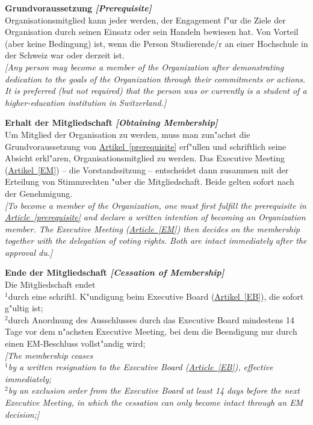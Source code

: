 \documentclass[10pt]{article}
\newcounter{qcounter}
\begin{document}
\begin{list}{{\bf Artikel :~}}{}
\item {\bf Grundvoraussetzung {\it[Prerequisite]}}\label{prerequisite}\\
Organisationsmitglied kann jeder werden, der Engagement f"ur die Ziele der Organisation durch seinen Einsatz oder sein Handeln bewiesen hat. Von Vorteil (aber keine Bedingung) ist, wenn die Person Studierende/r an einer Hochschule in der Schweiz war oder derzeit ist.\\
{\it[Any person may become a member of the Organization after demonstrating dedication to the goals of the Organization through their commitments or actions. It is preferred (but not required) that the person was or currently is a student of a higher-education institution in Switzerland.]}

\item {\bf Erhalt der Mitgliedschaft {\it[Obtaining Membership]}}\\
Um Mitglied der Organisation zu werden, muss man zun"achst die Grundvoraussetzung von \hyperref[prerequisite]{Artikel~\ref{prerequisite}} erf"ullen und schriftlich seine Absicht erkl"aren, Organisationsmitglied zu werden. Das Executive Meeting (\hyperref[EM]{Artikel~\ref{EM}}) – die Vorstandssitzung – entscheidet dann zusammen mit der Erteilung von Stimmrechten "uber die Mitgliedschaft. Beide gelten sofort nach der Genehmigung.\\
{\it[To become a member of the Organization, one must first fulfill the prerequisite in \hyperref[prerequisite]{Article~\ref{prerequisite}} and declare a written intention of becoming an Organization member. The Executive Meeting (\hyperref[EM]{Article~\ref{EM}}) then decides on the membership together with the delegation of voting rights. Both are intact immediately after the approval du.]}


\item {\bf Ende der Mitgliedschaft {\it[Cessation of Membership]}}\\ \label{cessation}
Die Mitgliedschaft endet\\
$^{1}$durch eine schriftl. K"undigung beim Executive Board (\hyperref[EB]{Artikel~\ref{EB}}), die sofort g"ultig ist;\\
$^{2}$durch Anordnung des Ausschlusses durch das Executive Board mindestens 14 Tage vor dem n"achsten Executive Meeting, bei dem die Beendigung nur durch einen EM-Beschluss vollst"andig wird;\\
{\it[The membership ceases\\ 
$^{1}$by a written resignation to the Executive Board (\hyperref[EB]{Article~\ref{EB}}), effective immediately;\\
$^{2}$by an exclusion order from the Executive Board at least 14 days before the next Executive Meeting, in which the cessation can only become intact through an EM decision;]}


\end{list}
\end{document}
